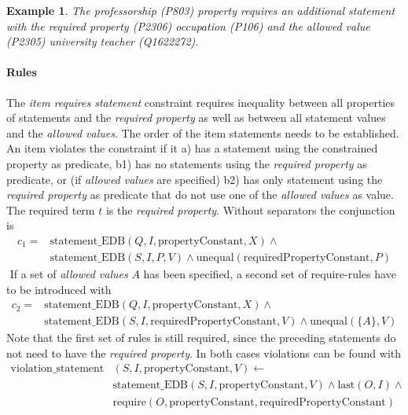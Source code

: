 \documentclass[hyperref,bachelorofscience,fleqn]{cgvpub}
\newtheorem{example}{Example}
\begin{document}
\begin{example}
The \emph{professorship} (P803) property requires an additional statement with the \emph{required property} (P2306) \emph{occupation} (P106) and the \emph{allowed value} (P2305) \emph{university teacher} (Q1622272).
\end{example}

\paragraph{Rules}
The \emph{item requires statement} constraint requires inequality between all properties of statements and the \emph{required property} as well as between all statement values and the \emph{allowed values}. The order of the item statements needs to be established. An item violates the constraint if it a) has a statement using the constrained property as predicate, b1) has no statements using the \emph{required property} as predicate, or (if \emph{allowed values} are specified) b2) has only statement using the \emph{required property} as predicate that do not use one of the \emph{allowed values} as value. The required term \(t\) is the \emph{required property}. Without separators the conjunction is
\begin{equation*}
\begin{split}
c_1 = &\text{statement\_EDB}(Q, I, \text{propertyConstant}, X) \wedge{} \\
&\text{statement\_EDB}(S, I, P, V) \wedge \text{unequal}(\text{requiredPropertyConstant}, P)
\end{split}
\end{equation*} \(\)
If a set of \emph{allowed values} \(A\) has been specified, a second set of require-rules have to be introduced with
\begin{equation*}
\begin{split}
c_2 = &\text{statement\_EDB}(Q, I, \text{propertyConstant}, X) \wedge{} \\
&\text{statement\_EDB}(S, I, \text{requiredPropertyConstant}, V) \wedge \text{unequal}(\{A\}, V)
\end{split}
\end{equation*}
Note that the first set of rules is still required, since the preceding statements do not need to have the \emph{required property}. In both cases violations can be found with
\begin{equation*}
\begin{split}
\text{violation\_statement}&(S, I, \text{propertyConstant}, V) \leftarrow \\
&\text{statement\_EDB}(S, I, \text{propertyConstant}, V) \wedge{} \text{last}(O, I) \wedge{} \\
&\text{require}(O, \text{propertyConstant}, \text{requiredPropertyConstant})
\end{split}
\end{equation*}
\end{document}
